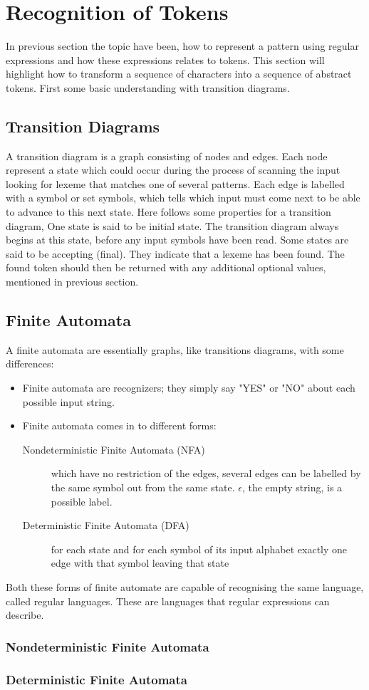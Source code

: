 \section{Recognition of Tokens}
In previous section the topic have been, how to represent a pattern using 
regular expressions and how these expressions relates to tokens. This section 
will highlight how to transform a sequence of characters into a sequence of 
abstract tokens. First some basic understanding with transition diagrams.  
\subsection{Transition Diagrams}
A transition diagram is a graph consisting of nodes and edges. Each node 
represent a state which could occur during the process of scanning the input 
looking for lexeme that matches one of several patterns. Each edge is labelled 
with a symbol or set symbols, which tells which input must come next to be able 
to advance to this next state. Here follows some properties for a transition 
diagram, One state is said to be initial state. The transition diagram always 
begins at this state, before any input symbols have been read. Some states are 
said to be accepting (final). They indicate that a lexeme has been found. The 
found token should then be returned with any additional optional values, 
mentioned in previous section. \cite{Aho2006}
\subsection{Finite Automata}
A finite automata are essentially graphs, like transitions diagrams, with some 
differences:
\begin{itemize}
  \item Finite automata are recognizers; they simply say "YES" or "NO" about 
each possible input string.
  \item Finite automata comes in to different forms:
    \begin{description}
      \item [Nondeterministic Finite Automata (NFA)] which have no restriction 
of the edges, several edges can be labelled by the same symbol out from the 
same state. $\epsilon$, the empty string, is a possible label. 
      \item [Deterministic Finite Automata (DFA)] for each state and for each 
symbol of its input alphabet exactly one edge with that symbol leaving that 
state
    \end{description}
\end{itemize}
Both these forms of finite automate are capable of recognising the same 
language, called regular languages. These are languages that regular 
expressions can describe. \cite{Aho2006}
\subsubsection{Nondeterministic Finite Automata}
\subsubsection{Deterministic Finite Automata}

 
